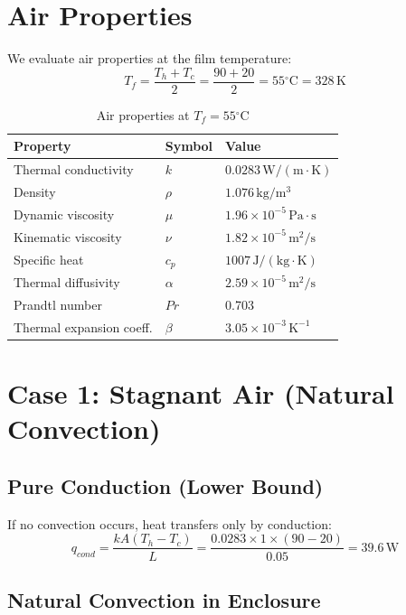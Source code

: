 \documentclass[11pt]{article}
\newcommand{\degC}{$^\circ$C}
\newcommand{\unit}[1]{\,\mathrm{#1}}
\begin{document}
\section{Air Properties}

We evaluate air properties at the film temperature:
\begin{equation}
    T_f = \frac{T_h + T_c}{2} = \frac{90 + 20}{2} = 55\text{\degC} = 328\unit{K}
\end{equation}

\begin{table}[h]
\centering
\caption{Air properties at $T_f = 55$\degC}
\begin{tabular}{lll}
\toprule
\textbf{Property} & \textbf{Symbol} & \textbf{Value} \\
\midrule
Thermal conductivity & $k$ & $0.0283\unit{W/(m \cdot K)}$ \\
Density & $\rho$ & $1.076\unit{kg/m^3}$ \\
Dynamic viscosity & $\mu$ & $1.96 \times 10^{-5}\unit{Pa \cdot s}$ \\
Kinematic viscosity & $\nu$ & $1.82 \times 10^{-5}\unit{m^2/s}$ \\
Specific heat & $c_p$ & $1007\unit{J/(kg \cdot K)}$ \\
Thermal diffusivity & $\alpha$ & $2.59 \times 10^{-5}\unit{m^2/s}$ \\
Prandtl number & $Pr$ & 0.703 \\
Thermal expansion coeff. & $\beta$ & $3.05 \times 10^{-3}\unit{K^{-1}}$ \\
\bottomrule
\end{tabular}
\label{tab:properties}
\end{table}

\section{Case 1: Stagnant Air (Natural Convection)}

\subsection{Pure Conduction (Lower Bound)}

If no convection occurs, heat transfers only by conduction:
\begin{equation}
    q_{cond} = \frac{kA(T_h - T_c)}{L} = \frac{0.0283 \times 1 \times (90 - 20)}{0.05} = \boxed{39.6\unit{W}}
\end{equation}

\subsection{Natural Convection in Enclosure}
\end{document}
